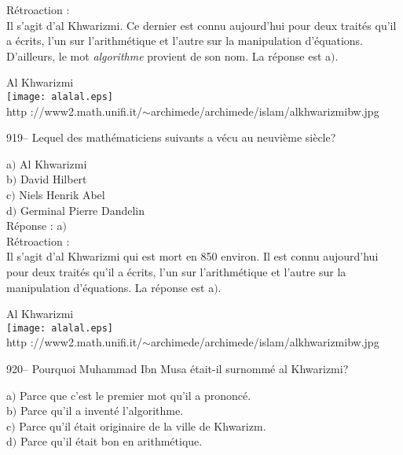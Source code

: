 ﻿\documentclass[letterpaper, 12pt]{article}
\begin{document}
R\'etroaction : \\
Il s'agit d'al Khwarizmi. Ce dernier est connu aujourd'hui pour deux
trait\'es qu'il a \'ecrits, l'un sur l'arithm\'etique et l'autre sur
la manipulation d'\'equations. D'ailleurs, le mot
{\sl algorithme} provient de son nom. La r\'eponse est a$)$.\\

        \begin{center}
        Al Khwarizmi\\
    \texttt{[image: alalal.eps]}\\
        {\footnotesize http
://www2.math.unifi.it/$\sim$archimede/archimede/islam/alkhwarizmibw.jpg}
    \end{center}

919-- Lequel des math\'ematiciens suivants a v\'ecu au neuvi\`eme
si\`ecle?

a$)$ Al Khwarizmi \\
b$)$ David Hilbert \\
c$)$ Niels Henrik Abel \\
d$)$ Germinal Pierre Dandelin\\

R\'eponse : a$)$\\

R\'etroaction :  \\
Il s'agit d'al Khwarizmi qui est mort en 850 environ. Il est connu
aujourd'hui pour deux trait\'es qu'il a \'ecrits,
l'un sur l'arithm\'etique et l'autre sur la manipulation d'\'equations. La
r\'eponse est a$)$.\\

        \begin{center}
        Al Khwarizmi\\
    \texttt{[image: alalal.eps]}\\
        {\footnotesize http
://www2.math.unifi.it/$\sim$archimede/archimede/islam/alkhwarizmibw.jpg}
    \end{center}

920-- Pourquoi Muhammad Ibn Musa \'etait-il surnomm\'e al Khwarizmi?

a$)$ Parce que c'est le premier mot qu'il a prononc\'e. \\
b$)$ Parce qu'il a invent\'e l'algorithme. \\
c$)$ Parce qu'il \'etait originaire de la ville de Khwarizm. \\
d$)$ Parce qu'il \'etait bon en arithm\'etique.  \\
\end{document}
